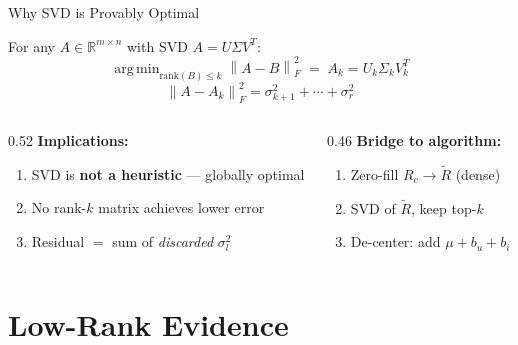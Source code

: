 \documentclass[10pt,t]{beamer}
\DeclareMathOperator*{\argmin}{arg\,min}
\newcommand{\FroSq}[1]{\left\|#1\right\|_F^2}
\newcommand{\R}{\mathbb{R}}
\begin{document}
\begin{frame}{Why SVD is Provably Optimal}
  \begin{theorem}
    For any $A\in\R^{m\times n}$ with SVD $A = U\Sigma V^T$:
    \[
      \argmin_{\mathrm{rank}(B)\leq k}\FroSq{A-B}
      \;=\; A_k = U_k\Sigma_k V_k^T
    \]
    \[
      \FroSq{A-A_k} = \sigma_{k+1}^2 + \cdots + \sigma_r^2
    \]
  \end{theorem}

  \begin{columns}[t]
    \begin{column}{0.52\textwidth}
      \textbf{Implications:}
      \begin{enumerate}
        \item SVD is \textbf{not a heuristic} — globally optimal
        \item No rank-$k$ matrix achieves lower error
        \item Residual $=$ sum of \emph{discarded} $\sigma_l^2$
      \end{enumerate}
    \end{column}
    \begin{column}{0.46\textwidth}
      \textbf{Bridge to algorithm:}
      \begin{enumerate}
        \item Zero-fill $R_c \to \tilde{R}$ (dense)
        \item SVD of $\tilde{R}$, keep top-$k$
        \item De-center: add $\mu+b_u+b_i$
      \end{enumerate}
    \end{column}
  \end{columns}
\end{frame}

\section{Low-Rank Evidence}
\end{document}
